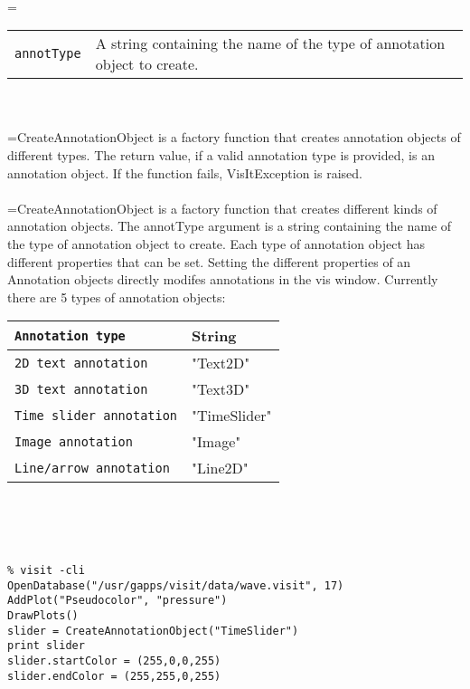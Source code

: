 \documentclass[10pt,a4paper]{report}
\begin{document}
 \\ 
\hangindent=\parindent 
\begin{tabular}{lp{9cm}}
\verb!annotType! & A string containing the name of the type of annotation object to create. \\
\end{tabular} \\[-2mm]


 \\ 
\hangindent=\parindent CreateAnnotationObject is a factory function that creates annotation objects of different types. The return value, if a valid annotation type is provided, is an annotation object. If the function fails, VisItException is raised. \\[-3mm] 

 \\ 
\hangindent=\parindent CreateAnnotationObject is a factory function that creates different kinds of annotation objects. The annotType argument is a string containing the name of the type of annotation object to create. Each type of annotation object has different properties that can be set. Setting the different properties of an Annotation objects directly modifes annotations in the vis window. Currently there are 5 types of annotation objects: \\

\begin{tabular}{|l|l|}
\hline
\verb!Annotation type! & String \\
\hline \hline
\verb!2D text annotation! & "Text2D" \\
\verb!3D text annotation! & "Text3D" \\
\verb!Time slider annotation! & "TimeSlider" \\
\verb!Image annotation! & "Image" \\
\verb!Line/arrow annotation! & "Line2D" \\
\hline
\end{tabular} \\[-2mm]
\\[-3mm] 

\\[-6mm]
\begin{verbatim}% visit -cli
OpenDatabase("/usr/gapps/visit/data/wave.visit", 17)
AddPlot("Pseudocolor", "pressure")
DrawPlots()
slider = CreateAnnotationObject("TimeSlider")
print slider
slider.startColor = (255,0,0,255)
slider.endColor = (255,255,0,255)
\end{verbatim}
\newpage
\end{document}

